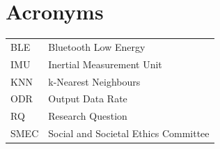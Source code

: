 \section*{Acronyms}

\begin{tabular}{ll}
BLE & Bluetooth Low Energy \\
IMU & Inertial Measurement Unit \\
KNN & k-Nearest Neighbours \\
ODR & Output Data Rate \\
RQ & Research Question \\
SMEC & Social and Societal Ethics Committee \\
\end{tabular}

